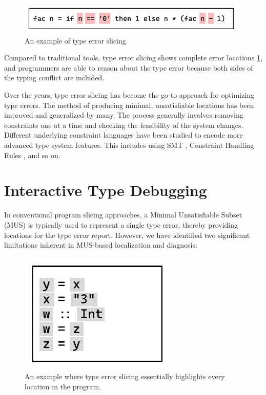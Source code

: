 \begin{figure}[hbt]
  \includegraphics[width=0.5\linewidth]{TypeErrorSlicing.pdf}
  \caption{
    \label{fig:type-error-slicing}
      An example of type error slicing}
\end{figure}

Compared to traditional tools, type error slicing shows complete error locations \ref{fig:type-error-slicing}, and programmers are able to reason about the type error because both sides of the typing conflict are included. 

Over the years, type error slicing has become the go-to approach for optimizing type errors. The method of producing minimal, unsatisfiable locations has been improved and generalized by many. The process generally involves removing constraints one at a time and checking the feasibility of the system changes. Different underlying constraint languages have been studied to encode more advanced type system features. This includes using SMT \cite{Pavlinovic2015-ke}, Constraint Handling Rules \cite{Stuckey2003-pz}, and so on. 



\section{Interactive Type Debugging}

In conventional program slicing approaches, a Minimal Unsatisfiable Subset (MUS) is typically used to represent a single type error, thereby providing locations for the type error report. However, we have identified two significant limitations inherent in MUS-based localization and diagnosis:


\begin{figure}[hbt]
  \includegraphics[width=0.5\linewidth]{SlicingCounterExample}
  \caption{
    \label{fig:slicing-counter-example}
      An example where type error slicing essentially highlights every location in the program.}
\end{figure}


